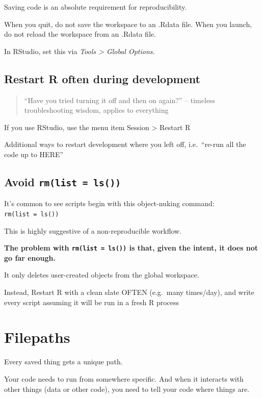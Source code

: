 \documentclass[
  letterpaper,
  DIV=11,
  numbers=noendperiod]{scrreprt}
\begin{document}
Saving code is an absolute requirement for reproducibility.

When you quit, do not save the workspace to an .Rdata file. When you
launch, do not reload the workspace from an .Rdata file.

In RStudio, set this via \emph{Tools \textgreater{} Global Options.}

\hypertarget{restart-r-often-during-development}{%
\subsection{Restart R often during
development}\label{restart-r-often-during-development}}

\begin{quote}
``Have you tried turning it off and then on again?'' -- timeless
troubleshooting wisdom, applies to everything
\end{quote}

If you use RStudio, use the menu item Session \textgreater{} Restart R

Additional ways to restart development where you left off, i.e.~``re-run
all the code up to HERE''

\hypertarget{avoid-rmlist-ls}{%
\subsection{\texorpdfstring{Avoid
\texttt{rm(list\ =\ ls())}}{Avoid rm(list = ls())}}\label{avoid-rmlist-ls}}

It's common to see scripts begin with this object-nuking command:
\texttt{rm(list\ =\ ls())}

This is highly suggestive of a non-reproducible workflow.

\textbf{The problem with \texttt{rm(list\ =\ ls())} is that, given the
intent, it does not go far enough.}

It only deletes user-created objects from the global workspace.

Instead, Restart R with a clean slate OFTEN (e.g.~many times/day), and
write every script assuming it will be run in a fresh R process

\hypertarget{filepaths}{%
\section{Filepaths}\label{filepaths}}

Every saved thing gets a unique path.

Your code needs to run from somewhere specific. And when it interacts
with other things (data or other code), you need to tell your code where
things are.
\end{document}
